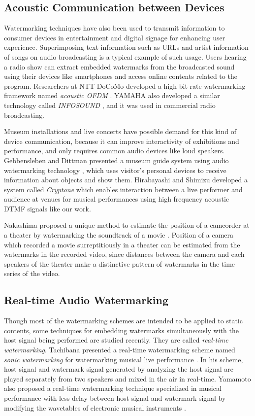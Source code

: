 \subsection{Acoustic Communication between Devices}
Watermarking techniques have also been used to transmit information to consumer devices in entertainment and digital signage for enhancing user experience.
Superimposing text information such as URLs and artist information of songs on audio broadcasting is a typical example of such usage.
Users hearing a radio show can extract embedded watermarks from the broadcasted sound using their devices like smartphones and access online contents related to the program.
Researchers at NTT DoCoMo developed a high bit rate watermarking framework named {\it acoustic OFDM} \cite{matsuoka2008acoustic}. YAMAHA also developed a similar technology called {\it INFOSOUND} \cite{infosound}, and it was used in commercial radio broadcasting.

Museum installations and live concerts have possible demand for this kind of device communication, because it can improve interactivity of exhibitions and performance, and only requires common audio devices like loud speakers.
Gebbensleben and Dittman presented a museum guide system using audio watermarking technology \cite{gebbensleben2006multimodal}, which uses visitor's personal devices to receive information about objects and show them.
Hirabayashi and Shimizu developed a system called {\it Cryptone} which enables interaction between a live performer and audience at venues for musical performances using high frequency acoustic DTMF signals like our work. \cite{Hirabayashi:2012:CIP:2407707.2407712}

Nakashima proposed a unique method to estimate the position of a camcorder at a theater by watermarking the soundtrack of a movie \cite{nakashima2009watermarked}.
Position of a camera which recorded a movie surreptitiously in a theater can be estimated from the watermarks in the recorded video, since distances between the camera and each speakers of the theater make a distinctive pattern of watermarks in the time series of the video.

\subsection{Real-time Audio Watermarking}
Though most of the watermarking schemes are intended to be applied to static contents, some techniques for embedding watermarks simultaneously with the host signal being performed are studied recently. They are called {\it real-time watermarking}.
Tachibana presented a real-time watermarking scheme named {\it sonic watermarking} for watermarking musical live performance \cite{tachibana2003audio}. In his scheme, host signal and watermark signal generated by analyzing the host signal are played separately from two speakers and mixed in the air in real-time.
Yamamoto also proposed a real-time watermarking technique specialized in musical performance with less delay between host signal and watermark signal by modifying the wavetables of electronic musical instruments \cite{yamamoto2010real}.
